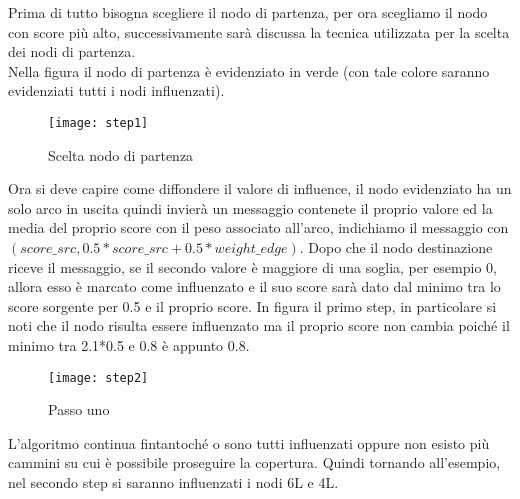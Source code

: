 Prima di tutto bisogna scegliere il nodo di partenza, per ora scegliamo il nodo
con score più alto, successivamente sarà discussa la tecnica utilizzata per la scelta
dei nodi di partenza. \\
Nella figura il nodo di partenza è evidenziato in verde (con tale colore saranno
evidenziati tutti i nodi influenzati).

\begin{figure}[!htbp]
  \begin{center}
    \texttt{[image: step1]}
  	\caption{Scelta nodo di partenza}
  	\label{step1}
  \end{center}
\end{figure}
\clearpage
Ora si deve capire come diffondere il valore di influence, il nodo evidenziato ha
un solo arco in uscita quindi invierà un messaggio contenete il proprio valore ed
la media del proprio score con il peso associato all'arco, indichiamo il messaggio
con $(score\_src, 0.5*score\_src+0.5*weight\_edge)$. Dopo che il nodo destinazione
riceve il messaggio, se il secondo valore è maggiore di una soglia, per esempio 0,
allora esso è marcato come influenzato e il suo score sarà dato dal minimo tra lo score sorgente
per 0.5 e il proprio score. In figura il primo step, in particolare si noti che il nodo
risulta essere influenzato ma il proprio score non cambia poiché il minimo tra 2.1*0.5 e 0.8 è appunto 0.8.

\begin{figure}[!htbp]
  \begin{center}
    \texttt{[image: step2]}
  	\caption{Passo uno}
  	\label{step2}
  \end{center}
\end{figure}
\clearpage
L'algoritmo continua fintantoché o sono tutti influenzati oppure non esisto più cammini
su cui è possibile proseguire la copertura. Quindi tornando all'esempio, nel secondo step
si saranno influenzati i nodi 6L e 4L.


